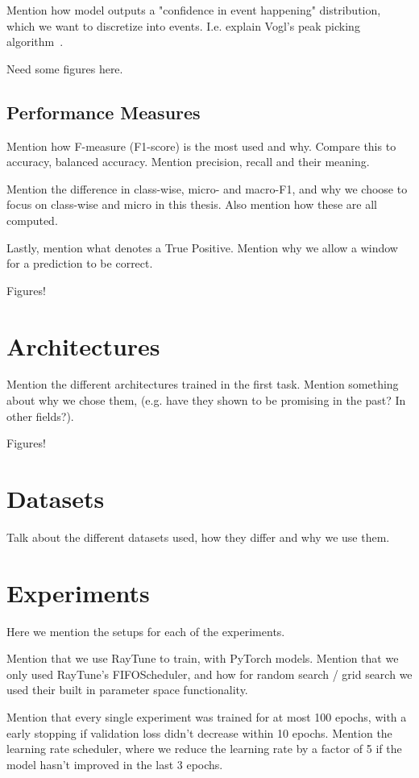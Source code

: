 Mention how model outputs a "confidence in event happening" distribution, which we want to discretize into events.
I.e. explain Vogl's peak picking algorithm~\cite{vogl2018multiinstrumentdrumtranscription}.

Need some figures here.

\subsection{Performance Measures}

Mention how F-measure (F1-score) is the most used and why. Compare this to accuracy, balanced accuracy. Mention precision, recall and their meaning.

Mention the difference in class-wise, micro- and macro-F1, and why we choose to focus on class-wise and micro in this thesis.
Also mention how these are all computed.

Lastly, mention what denotes a True Positive. Mention why we allow a window for a prediction to be correct.

Figures!

\section{Architectures}

Mention the different architectures trained in the first task.
Mention something about why we chose them, (e.g. have they shown to be promising in the past? In other fields?).

Figures!

\section{Datasets}

Talk about the different datasets used, how they differ and why we use them.

\section{Experiments}

Here we mention the setups for each of the experiments.

Mention that we use RayTune to train, with PyTorch models. Mention that we only used RayTune's FIFOScheduler, and how for random search / grid search we used their built in parameter space functionality.

Mention that every single experiment was trained for at most 100 epochs, with a early stopping if validation loss didn't decrease within 10 epochs.
Mention the learning rate scheduler, where we reduce the learning rate by a factor of 5 if the model hasn't improved in the last 3 epochs.

